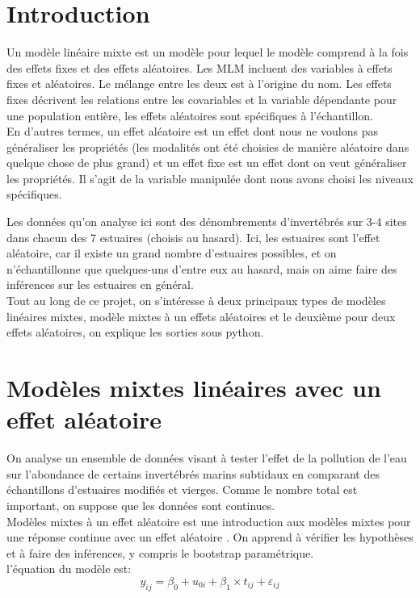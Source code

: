 \documentclass[10pt,a4paper,]{report}
\begin{document}
\begin{spacing}{1}

\tableofcontents

\pagestyle{fancy}
\renewcommand{\footrulewidth}{2pt}
\fancyhf{}
\fancyfoot[C]{\thepage}

\renewcommand{\headrulewidth}{2pt}
\fancyhead[C]{{\rightmark}}
\newpage
\chapter*{Introduction}
Un modèle linéaire mixte est un modèle pour lequel le modèle comprend à la fois des effets fixes et des
effets aléatoires. Les MLM incluent des variables à effets fixes et aléatoires. Le mélange entre les deux est à
l'origine du nom. Les effets fixes décrivent les relations entre les covariables et la variable dépendante pour
une population entière, les effets aléatoires sont spécifiques à l'échantillon.\\
En d'autres termes, un effet aléatoire est un effet dont nous ne voulons pas généraliser les propriétés (les
modalités ont été choisies de manière aléatoire dans quelque chose de plus grand) et un effet fixe est un
effet dont on veut généraliser les propriétés. Il s'agit de la variable manipulée dont nous avons choisi les
niveaux spécifiques.


Les données qu'on analyse ici sont des dénombrements d'invertébrés sur 3-4 sites dans chacun des 7 estuaires (choisis au hasard). Ici, les estuaires sont l'effet aléatoire, car il existe un grand nombre d'estuaires possibles, et on n'échantillonne que quelques-uns d'entre eux au hasard, mais on aime faire des inférences sur les estuaires en général.\\
Tout au long de ce projet, on s'intéresse à deux  principaux types de modèles linéaires mixtes, modèle mixtes à un effets aléatoires et le deuxième pour deux effets aléatoires, on explique les sorties sous python.

\newpage
\chapter{Modèles mixtes linéaires avec un effet aléatoire }
 On analyse un ensemble de données visant à tester l'effet de la pollution de l'eau sur l'abondance de certains invertébrés marins subtidaux en comparant des échantillons d'estuaires modifiés et vierges. Comme le nombre total est important, on suppose que les données sont continues.
\\
Modèles mixtes à un effet aléatoire est une introduction aux modèles mixtes pour une réponse continue avec un effet aléatoire . On apprend à vérifier les hypothèses et à faire des inférences, y compris le bootstrap paramétrique.\\
l'équation du modèle est: $$y_{ij} = \beta_0 + u_{0i} + \beta_1 \times t_{ij} + \varepsilon_{ij}$$



\end{spacing}
\end{document}

